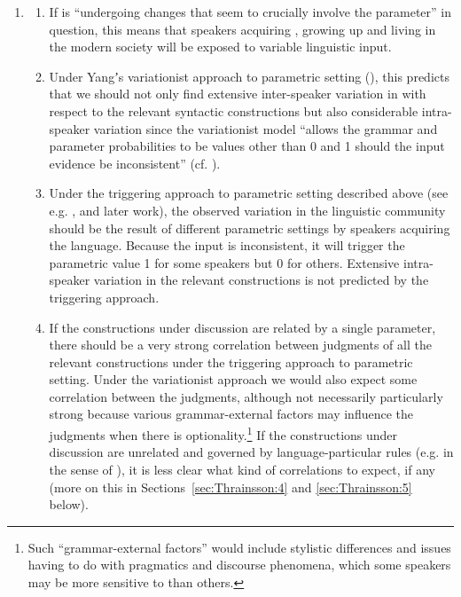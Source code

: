 \documentclass[output=paper]{LSP/langsci}
\begin{document}
\begin{enumerate}[ref=\arabic*,label=(\arabic*),start=2] \item \label{ex:thrainsson:2}\begin{enumerate}[label=\arabic*.]
    \item If  is “undergoing changes that seem 
    to crucially involve the parameter” in question, this means that speakers acquiring , growing up and living in the modern  society will be exposed to variable linguistic input.

    \item Under Yangʼs variationist approach to parametric setting (\citeyear{Yang2004}), this predicts that we should not only find extensive inter-speaker variation in  with respect to the relevant syntactic constructions but also considerable intra-speaker variation since the variationist model “allows the grammar and parameter probabilities to be values other than 0 and 1 should the input evidence be inconsistent” (cf. \citealt[455]{Yang2004}).

    \item Under the triggering approach to parametric setting described above (see e.g. \citealt{Gibson1994}, \citealt{Lightfoot1999} and later work), the observed variation in the  linguistic community should be the result of different parametric settings by speakers acquiring the language. Because the input is inconsistent, it will trigger the parametric value 1 for some speakers but 0 for others. Extensive intra-speaker variation in the relevant constructions is not predicted by the triggering approach.

    \item If the constructions under discussion are related by a single parameter, there should be a very strong correlation between judgments of all the relevant constructions under the triggering approach to parametric setting. Under the variationist approach we would also expect some correlation between the judgments, although not necessarily particularly strong because various grammar-external factors may influence the judgments when there is optionality.\footnote{Such “grammar-external factors” would include stylistic differences and issues having to do with pragmatics and discourse phenomena, which some speakers may be more sensitive to than others.} If the constructions under discussion are unrelated and governed by language-particular rules (e.g. in the sense of \citealt{Newmeyer2004,Newmeyer2005}), it is less clear what kind of correlations to expect, if any (more on this in Sections~\ref{sec:Thrainsson:4} and \ref{sec:Thrainsson:5} below).
\end{enumerate} \end{enumerate}
\end{document}
